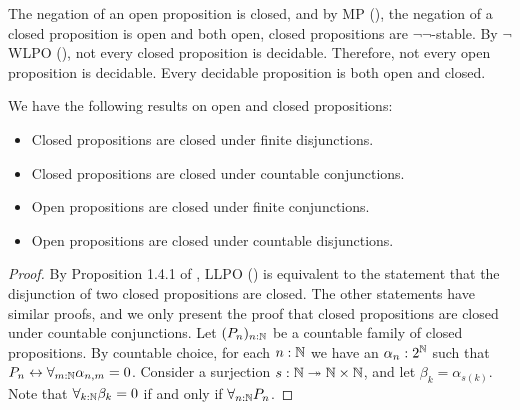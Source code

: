 \begin{remark}\label{rmkOpenClosedNegation}
  The negation of an open proposition is closed, 
  and by MP (), the negation of a closed proposition is open %
  and both open, closed propositions are $\neg\neg$-stable. 
  By $\neg$WLPO (), 
  not every closed proposition is decidable. 
  Therefore, not every open proposition is decidable. 
  Every decidable proposition is both open and closed.
\end{remark}
\begin{lemma}
  We have the following results on open and closed propositions:
  \begin{itemize}
    \item Closed propositions are closed under finite disjunctions. 
    \item Closed propositions are closed under countable conjunctions. 
    \item Open propositions are closed under finite conjunctions. 
    \item Open propositions are closed under countable disjunctions. 
  \end{itemize}
\end{lemma}
\begin{proof}
  By Proposition 1.4.1 of \cite{HannesDiener}, LLPO () is equivalent to the statement that 
  the disjunction of two closed propositions are closed. 
  The other statements have similar proofs, and we only present the proof that closed propositions are closed under 
  countable conjunctions. 
  Let $(P_n)_{n:\mathbb{N}}$ be a countable family of closed propositions. 
  By countable choice, for each 
  $n:\mathbb{N}$ we have an $\alpha_n:2^{\mathbb{N}} $ 
  such that $P_n \leftrightarrow \forall_{m:\mathbb{N}} \alpha_{n,m} =0$. 
  Consider a surjection $s:\mathbb{N} \twoheadrightarrow \mathbb{N} \times \mathbb{N}$, and let 
  $\beta_k = \alpha_{s(k)}.$
  Note that $\forall_{k:\mathbb{N}} \beta_k = 0$ if and only if 
  $\forall_{n:\mathbb{N}} P_n$. 
\end{proof}
